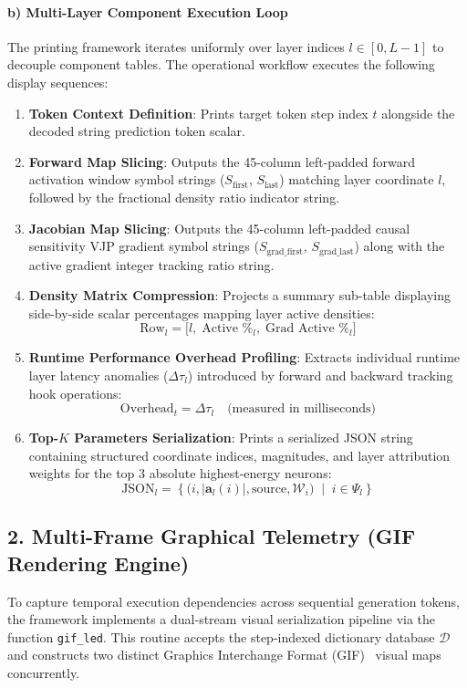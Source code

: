 \documentclass[10pt,conference]{IEEEtran}
\begin{document}
\paragraph*{b) Multi-Layer Component Execution Loop}
\begin{sloppypar}
The printing framework iterates uniformly over layer indices $l \in [0, L-1]$ to decouple component tables. The operational workflow executes the following display sequences:
\end{sloppypar}

\begin{enumerate}
    \item \textbf{Token Context Definition}: Prints target token step index $t$ alongside the decoded string prediction token scalar.
    \item \textbf{Forward Map Slicing}: Outputs the 45-column left-padded forward activation window symbol strings ($S_{\text{first}}$, $S_{\text{last}}$) matching layer coordinate $l$, followed by the fractional density ratio indicator string.
    \item \textbf{Jacobian Map Slicing}: Outputs the 45-column left-padded causal sensitivity VJP gradient symbol strings ($S_{\text{grad\_first}}$, $S_{\text{grad\_last}}$) along with the active gradient integer tracking ratio string.
    \item \textbf{Density Matrix Compression}: Projects a summary sub-table displaying side-by-side scalar percentages mapping layer active densities:
    \[
    \text{Row}_l = \Big[ l, \; \text{Active \%}_l, \; \text{Grad Active \%}_l \Big]
    \]
    \item \textbf{Runtime Performance Overhead Profiling}: Extracts individual runtime layer latency anomalies ($\Delta \tau_l$) introduced by forward and backward tracking hook operations:
    \[
    \text{Overhead}_t = \Delta \tau_l \quad \text{(measured in milliseconds)}
    \]
    \item \textbf{Top-$K$ Parameters Serialization}: Prints a serialized JSON string containing structured coordinate indices, magnitudes, and layer attribution weights for the top 3 absolute highest-energy neurons:
    \[
    \text{JSON}_l = \left\{ \big(i, |\mathbf{a}_l(i)|, \text{source}, \mathcal{W}_i\big) \;\middle\vert{}\; i \in \Psi_l \right\}
    \]
\end{enumerate}

\subsection*{2. Multi-Frame Graphical Telemetry (GIF Rendering Engine)}
To capture temporal execution dependencies across sequential generation tokens, the framework implements a dual-stream visual serialization pipeline via the function \texttt{gif\_led}. This routine accepts the step-indexed dictionary database $\mathcal{D}$ and constructs two distinct Graphics Interchange Format (GIF)~\cite{compuserve1987gif87a} visual maps concurrently.
\end{document}
